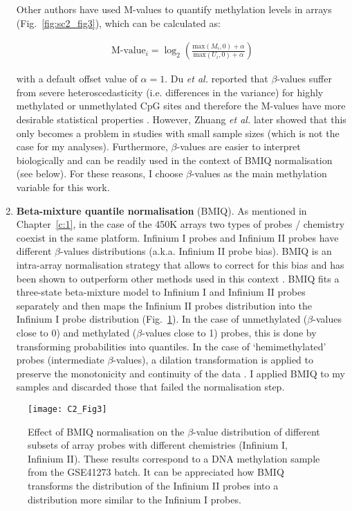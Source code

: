 \begin{enumerate}
	Other authors have used M-values to quantify methylation levels in arrays (Fig.~\ref{fig:sc2_fig3}), which can be calculated as:
	
	\begin{align}
	\text{M-value}_i = \log_2 \left(\frac{\text{max}(M_i,0) + \alpha}{\text{max}(U_i,0) + \alpha}\right)
	\end{align}
	
	with a default offset value of $\alpha=1$.  Du \textit{et al.} reported that $\beta$-values suffer from severe heteroscedasticity (i.e. differences in the variance) for highly methylated or unmethylated CpG sites and therefore the M-values have more desirable statistical properties \cite{Du2010}. However, Zhuang \textit{et al.} later showed that this only becomes a problem in studies with small sample sizes \cite{Zhuang2012} (which is not the case for my analyses). Furthermore, $\beta$-values are easier to interpret biologically and can be readily used in the context of BMIQ normalisation (see below). For these reasons, I choose $\beta$-values as the main methylation variable for this work.
	
	\item \textbf{Beta-mixture quantile normalisation} (\acrshort{BMIQ}). As mentioned in Chapter~\ref{c:1}, in the case of the 450K arrays two types of probes / chemistry coexist in the same platform. Infinium I probes and Infinium II probes have different $\beta$-values distributions (a.k.a. Infinium II probe bias). BMIQ is an intra-array normalisation strategy that allows to correct for this bias and has been shown to outperform other methods used in this context \cite{Teschendorff2012,Dedeurwaerder2011,Touleimat2012,Maksimovic2012}. BMIQ fits a three-state beta-mixture model to Infinium I and Infinium II probes separately and then maps the Infinium II probes distribution into the Infinium I probe distribution (Fig.~\ref{fig:c2_fig3}). In the case of unmethylated ($\beta$-values close to 0) and methylated ($\beta$-values close to 1) probes, this is done by transforming probabilities into quantiles. In the case of `hemimethylated' probes (intermediate $\beta$-values), a dilation transformation is applied to preserve the monotonicity and continuity of the data \cite{Teschendorff2012}. I applied BMIQ to my samples and discarded those that failed the normalisation step.  
	
\end{enumerate}

\bigskip
 
\begin{figure}[htbp!] 
	\centering    
	\texttt{[image: C2\_Fig3]}
	\caption[Effect of BMIQ normalisation on the $\beta$-value distribution]{Effect of BMIQ normalisation on the $\beta$-value distribution of different subsets of array probes with different chemistries (Infinium I, Infinium II). These results correspond to a DNA methylation sample from the GSE41273 batch. It can be appreciated how BMIQ transforms the distribution of the Infinium II probes into a distribution more similar to the Infinium I probes.}
	\label{fig:c2_fig3}
\end{figure}

